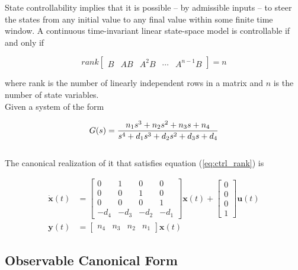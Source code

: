 \documentclass[10pt,conference,compsoc]{IEEEtran}
\newcommand{\mtx}[1] {\bm #1}
\begin{document}
\noindent State controllability implies that it is possible -- by admissible
inputs -- to steer the \glspl{state} from any initial value to any final value
within some finite time window. A continuous \gls{time-invariant} linear
state-space model is controllable if and only if

\begin{equation}
  rank \left[
  \begin{array}{ccccc}
    B & AB & A^2B & \cdots & A^{n-1}B
  \end{array}
  \right] = n
  \label{eq:ctrl_rank}
\end{equation}

\noindent where rank is the number of linearly independent rows in a matrix and
$n$ is the number of \gls{state} variables. \\

\noindent Given a \gls{system} of the form

\begin{equation} \label{eq:ctrl_obsv_tf}
  G(s) = \frac{n_1 s^3 + n_2 s^2 + n_3 s + n_4}
    {s^4 + d_1 s^3 + d_2 s^2 + d_3 s + d_4} \\
\end{equation}
\\
\noindent The canonical realization of it that satisfies equation
(\ref{eq:ctrl_rank}) is

\begin{align}
  \dot{\mtx{x}}(t) &= \left[
  \begin{array}{cccc}
    0 & 1 & 0 & 0 \\
    0 & 0 & 1 & 0 \\
    0 & 0 & 0 & 1 \\
    -d_4 & -d_3 & -d_2 & -d_1
  \end{array}
  \right] \mtx{x}(t) + \left[
  \begin{array}{c}
    0 \\
    0 \\
    0 \\
    1
  \end{array}
  \right] \mtx{u}(t) \\
  \mtx{y}(t) &= \left[
  \begin{array}{cccc}
    n_4 & n_3 & n_2 & n_1
  \end{array}
  \right] \mtx{x}(t)
\end{align}

\subsection{Observable Canonical Form} \label{subsec:obsv_canon}
\end{document}
